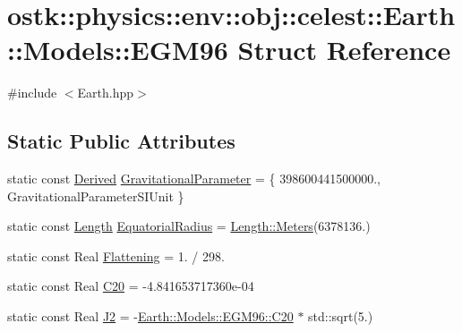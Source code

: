 \hypertarget{structostk_1_1physics_1_1env_1_1obj_1_1celest_1_1_earth_1_1_models_1_1_e_g_m96}{}\section{ostk\+:\+:physics\+:\+:env\+:\+:obj\+:\+:celest\+:\+:Earth\+:\+:Models\+:\+:E\+G\+M96 Struct Reference}
\label{structostk_1_1physics_1_1env_1_1obj_1_1celest_1_1_earth_1_1_models_1_1_e_g_m96}


{\ttfamily \#include $<$Earth.\+hpp$>$}

\subsection*{Static Public Attributes}
\begin{DoxyCompactItemize}
\item 
static const \hyperlink{classostk_1_1physics_1_1units_1_1_derived}{Derived} \hyperlink{structostk_1_1physics_1_1env_1_1obj_1_1celest_1_1_earth_1_1_models_1_1_e_g_m96_aa9bd99a13d1a3642806b5bb12238207e}{Gravitational\+Parameter} = \{ 398600441500000., Gravitational\+Parameter\+S\+I\+Unit \}
\item 
static const \hyperlink{classostk_1_1physics_1_1units_1_1_length}{Length} \hyperlink{structostk_1_1physics_1_1env_1_1obj_1_1celest_1_1_earth_1_1_models_1_1_e_g_m96_a6fd4657896411dfffa899b5d69c501c0}{Equatorial\+Radius} = \hyperlink{classostk_1_1physics_1_1units_1_1_length_ad227977ce00756791595796a0dd5ddd7}{Length\+::\+Meters}(6378136.)
\item 
static const Real \hyperlink{structostk_1_1physics_1_1env_1_1obj_1_1celest_1_1_earth_1_1_models_1_1_e_g_m96_a8e88f7d8d42fef033a94f610d6bb75f9}{Flattening} = 1. / 298.
\item 
static const Real \hyperlink{structostk_1_1physics_1_1env_1_1obj_1_1celest_1_1_earth_1_1_models_1_1_e_g_m96_a9ae4801d69fc8be4dcb24bc7496ff5b7}{C20} = -\/4.\+841653717360e-\/04
\item 
static const Real \hyperlink{structostk_1_1physics_1_1env_1_1obj_1_1celest_1_1_earth_1_1_models_1_1_e_g_m96_a304fd67c6142f1d6a0814647cbc90aad}{J2} = -\/\hyperlink{structostk_1_1physics_1_1env_1_1obj_1_1celest_1_1_earth_1_1_models_1_1_e_g_m96_a9ae4801d69fc8be4dcb24bc7496ff5b7}{Earth\+::\+Models\+::\+E\+G\+M96\+::\+C20} $\ast$ std\+::sqrt(5.)
\end{DoxyCompactItemize}


